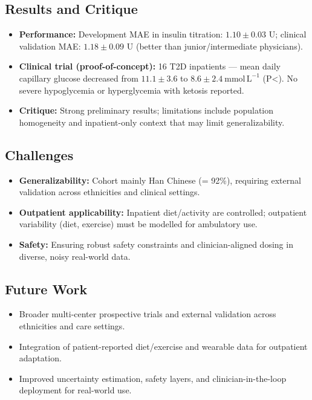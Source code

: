 \subsection*{Results and Critique}
\begin{itemize}
    \item \textbf{Performance:} Development MAE in insulin titration: $1.10\pm0.03$ U; clinical validation MAE: $1.18\pm0.09$ U (better than junior/intermediate physicians).
    \item \textbf{Clinical trial (proof-of-concept):} 16 T2D inpatients — mean daily capillary glucose decreased from $11.1\pm3.6$ to $8.6\pm2.4\ \mathrm{mmol\,L^{-1}}$ (P\!<). No severe hypoglycemia or hyperglycemia with ketosis reported.
    \item \textbf{Critique:} Strong preliminary results; limitations include population homogeneity and inpatient-only context that may limit generalizability.
\end{itemize}

\subsection*{Challenges}
\begin{itemize}
    \item \textbf{Generalizability:} Cohort mainly Han Chinese (= 92\%), requiring external validation across ethnicities and clinical settings.
    \item \textbf{Outpatient applicability:} Inpatient diet/activity are controlled; outpatient variability (diet, exercise) must be modelled for ambulatory use.
    \item \textbf{Safety:} Ensuring robust safety constraints and clinician-aligned dosing in diverse, noisy real-world data.
\end{itemize}

\subsection*{Future Work}
\begin{itemize}
    \item Broader multi-center prospective trials and external validation across ethnicities and care settings.
    \item Integration of patient-reported diet/exercise and wearable data for outpatient adaptation.
    \item Improved uncertainty estimation, safety layers, and clinician-in-the-loop deployment for real-world use.
\end{itemize}

